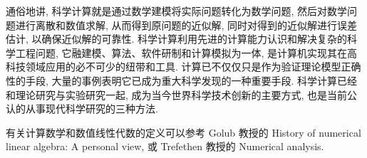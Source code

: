 通俗地讲, 科学计算就是通过数学建模将实际问题转化为数学问题,
然后对数学问题进行离散和数值求解, 从而得到原问题的近似解,
同时对得到的近似解进行误差估计, 以确保近似解的可靠性.
科学计算利用先进的计算能力认识和解决复杂的科学工程问题,
它融建模、算法、软件研制和计算模拟为一体,
是计算机实现其在高科技领域应用的必不可少的纽带和工具.
计算已不仅仅只是作为验证理论模型正确性的手段,
大量的事例表明它已成为重大科学发现的一种重要手段.
科学计算已经和理论研究与实验研究一起, 成为当今世界科学技术创新的主要方式,
也是当前公认的从事现代科学研究的三种方法.

\medskip

\begin{note}
	有关计算数学和数值线性代数的定义可以参考 Golub 教授的
	History of numerical linear algebra: A personal view,
	或 Trefethen 教授的 Numerical analysis.
\end{note}

